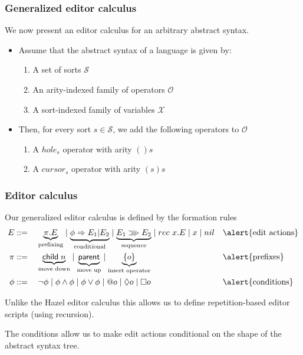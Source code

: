 \documentclass[t,24pt,aspectratio=169]{beamer}
\begin{document}
\begin{frame}
  \frametitle{Generalized editor calculus}

  We now present an editor calculus for an arbitrary abstract syntax.
  
    \begin{itemize}
        \item Assume that the abstract syntax of a language is given by:
              \begin{enumerate}
                  \item A set of sorts $\mathcal{S}$
                  \item An arity-indexed family of operators $\mathcal{O}$
                  \item A sort-indexed family of variables $\mathcal{X}$
              \end{enumerate}
        \item Then, for every sort $s \in \mathcal{S}$, we add the following operators to $\mathcal{O}$
              \begin{enumerate}
                  \item A $hole_s$ operator with arity $()s$
                  \item A $cursor_s$ operator with arity $(s)s$
              \end{enumerate}
    \end{itemize}
\end{frame}

\begin{frame}
  \frametitle{Editor calculus}

  Our generalized editor calculus is defined by the formation rules
    \[
        \begin{aligned}
            E    & ::= \quad \underbrace{\pi.E}_{\text{prefixing}} \mid \underbrace{\phi \Rightarrow E_1|E_2}_{\text{conditional}} \mid
            \underbrace{E_1 \ggg E_2}_{\text{sequence}} \mid rec \ x.E \mid x \mid nil      &  &
            \text{\alert{edit actions}}\\
            \pi  & ::= \quad \underbrace{\textsf{child}\; n}_{\text{move down}} 
            \mid \underbrace{\textsf{parent}}_{\text{move up}} \mid
            \underbrace{\{ o \}}_{\text{insert operator}}                                                          &  & \text{\alert{prefixes}}\\
            \phi & ::= \quad \neg \phi \mid\phi \land \phi \mid\phi
            \lor \phi \mid @o \mid \Diamond o \mid\square o && \text{\alert{conditions}}
        \end{aligned}
      \]

Unlike the Hazel editor calculus this allows us to define
repetition-based editor scripts (using recursion).

The conditions allow us to make edit actions conditional on the shape
of the abstract syntax tree.

\end{frame}
\end{document}
